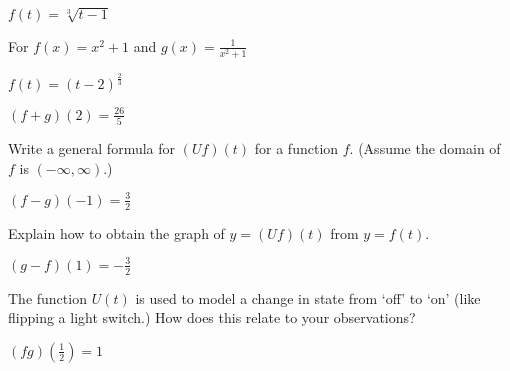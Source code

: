\documentclass{ximera}
\begin{document}
\begin{question}
$f(t) = \sqrt[3]{t-1}$ 
\begin{solution}
For  $f(x) = x^2+1$ and $g(x) = \frac{1}{x^2+1}$


\end{solution}

\end{question}

\begin{question}
$f(t) = (t-2)^{\frac{2}{3}}$ 


\begin{solution}
$(f+g)(2) =\frac{26}{5}$
\end{solution}

\end{question}

\begin{question}
Write a general formula for $(Uf)(t)$ for a function $f$.  (Assume the domain of $f$ is $(-\infty, \infty)$.)
\begin{solution}
$(f-g)(-1) = \frac{3}{2}$
\end{solution}

\end{question}

\begin{question}
Explain how to obtain the graph of $y=(Uf)(t)$ from $y=f(t)$.
\begin{solution}
$(g-f)(1) = -\frac{3}{2}$

\end{solution}

\end{question}

\begin{question}
The function $U(t)$ is used to model a change in state from `off' to `on' (like flipping a light switch.)  How does this relate to your observations?
\begin{solution}
$(fg)\left(\frac{1}{2}\right) =1$
\end{solution}

\end{question}
\end{document}
